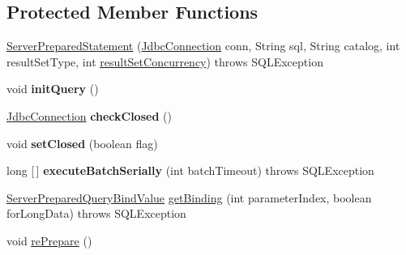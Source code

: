 \subsection*{Protected Member Functions}
\begin{DoxyCompactItemize}
\item 
\mbox{\hyperlink{classcom_1_1mysql_1_1cj_1_1jdbc_1_1_server_prepared_statement_a7ba66017e5f394e2b28838c1bb2509d6}{Server\+Prepared\+Statement}} (\mbox{\hyperlink{interfacecom_1_1mysql_1_1cj_1_1jdbc_1_1_jdbc_connection}{Jdbc\+Connection}} conn, String sql, String catalog, int result\+Set\+Type, int \mbox{\hyperlink{classcom_1_1mysql_1_1cj_1_1jdbc_1_1_statement_impl_a8cf4c2416671121707036791a1cd92b7}{result\+Set\+Concurrency}})  throws S\+Q\+L\+Exception 
\item 
\mbox{\label{classcom_1_1mysql_1_1cj_1_1jdbc_1_1_server_prepared_statement_a32fafc3584a50615fbe2ec40da7d4786}} 
void {\bfseries init\+Query} ()
\item 
\mbox{\label{classcom_1_1mysql_1_1cj_1_1jdbc_1_1_server_prepared_statement_a0879d304320cba9dca05b1ac253c069c}} 
\mbox{\hyperlink{interfacecom_1_1mysql_1_1cj_1_1jdbc_1_1_jdbc_connection}{Jdbc\+Connection}} {\bfseries check\+Closed} ()
\item 
\mbox{\label{classcom_1_1mysql_1_1cj_1_1jdbc_1_1_server_prepared_statement_a12594728430be5d936a706ddc26b8864}} 
void {\bfseries set\+Closed} (boolean flag)
\item 
\mbox{\label{classcom_1_1mysql_1_1cj_1_1jdbc_1_1_server_prepared_statement_ad45f1add2950dfa19f88d18796056c02}} 
long \mbox{[}$\,$\mbox{]} {\bfseries execute\+Batch\+Serially} (int batch\+Timeout)  throws S\+Q\+L\+Exception 
\item 
\mbox{\hyperlink{classcom_1_1mysql_1_1cj_1_1_server_prepared_query_bind_value}{Server\+Prepared\+Query\+Bind\+Value}} \mbox{\hyperlink{classcom_1_1mysql_1_1cj_1_1jdbc_1_1_server_prepared_statement_aea8dc33102ef15790b84b6ebf355452b}{get\+Binding}} (int parameter\+Index, boolean for\+Long\+Data)  throws S\+Q\+L\+Exception 
\item 
void \mbox{\hyperlink{classcom_1_1mysql_1_1cj_1_1jdbc_1_1_server_prepared_statement_a3cf52e5d0562a9bf53b44f162dd78fbf}{re\+Prepare}} ()

\end{DoxyCompactItemize}
